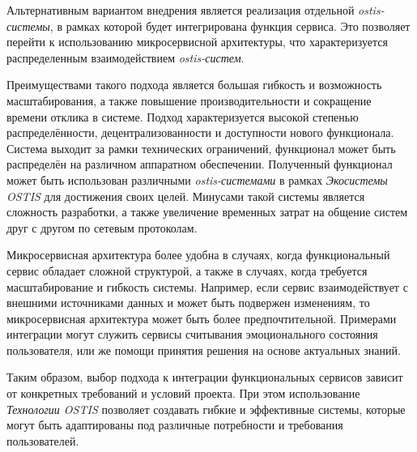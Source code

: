 Альтернативным вариантом внедрения является реализация отдельной \textit{ostis-системы}, в рамках которой будет интегрирована функция сервиса. Это позволяет перейти к использованию микросервисной архитектуры, что характеризуется распределенным взаимодействием \textit{ostis-систем}.

Преимуществами такого подхода является большая гибкость и возможность масштабирования, а также повышение производительности и сокращение времени отклика в системе. Подход характеризуется высокой степенью распределённости, децентрализованности и доступности нового функционала. Система выходит за рамки технических ограничений, функционал может быть распределён на различном аппаратном обеспечении. Полученный функционал может быть использован различными \textit{ostis-системами} в рамках \textit{Экосистемы OSTIS} для достижения своих целей. Минусами такой системы является сложность разработки, а также увеличение временных затрат на общение систем друг с другом по сетевым протоколам. 

Микросервисная архитектура более удобна в случаях, когда функциональный сервис обладает сложной структурой, а также в случаях, когда требуется масштабирование и гибкость системы. Например, если сервис взаимодействует с внешними источниками данных и может быть подвержен изменениям, то микросервисная архитектура может быть более предпочтительной.  Примерами интеграции могут служить сервисы считывания эмоционального состояния пользователя, или же помощи принятия решения на основе актуальных знаний.

Таким образом, выбор подхода к интеграции функциональных сервисов зависит от конкретных требований и условий проекта. При этом использование \textit{Технологии OSTIS} позволяет создавать гибкие и эффективные системы, которые могут быть адаптированы под различные потребности и требования пользователей.

